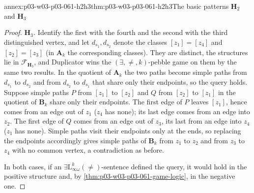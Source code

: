 \begin{annexitem}{annex:p03-w03-p03-061-h2h3}{thm:p03-w03-p03-061-h2h3}{The basic patterns \(\mathbf H_2\) and \(\mathbf H_3\)}
\begin{proof}
\emph{\(\mathbf H_3\).} Identify the first with the fourth and the second with
the third distinguished vertex, and let \(d_{s_1},d_{s_2}\) denote the classes
\([z_1]=[z_4]\) and \([z_2]=[z_3]\) (in \(\mathbf A_k\) the corresponding
classes). They are distinct, the structures lie in \(\mathcal F_{\mathbf
H_3}\), and Duplicator wins the \((\exists,\neq,k)\)-pebble game on them by
the same two results. In the quotient of \(\mathbf A_k\) the two paths become
simple paths from \(d_{s_1}\) to \(d_{s_2}\) and from \(d_{s_2}\) to
\(d_{s_1}\) that share only their endpoints, so the query holds. Suppose
simple paths \(P\) from \([z_1]\) to \([z_2]\) and \(Q\) from \([z_2]\) to
\([z_1]\) in the quotient of \(\mathbf B_k\) share only their endpoints. The
first edge of \(P\) leaves \([z_1]\), hence comes from an edge out of \(z_1\)
(\(z_4\) has none); its last edge comes from an edge into \(z_2\). The first
edge of \(Q\) comes from an edge out of \(z_3\), its last from an edge into
\(z_4\) (\(z_1\) has none). Simple paths visit their endpoints only at the
ends, so replacing the endpoints accordingly gives simple paths of
\(\mathbf B_k\) from \(z_1\) to \(z_2\) and from \(z_3\) to \(z_4\) with no
common vertex, a contradiction as before.

In both cases, if an \(\exists\mathrm L^k_{\infty\omega}(\neq)\)-sentence
defined the query, it would hold in the positive structure and, by
\cref{thm:p03-w03-p03-061-game-logic}, in the negative one.
\end{proof}
\end{annexitem}

